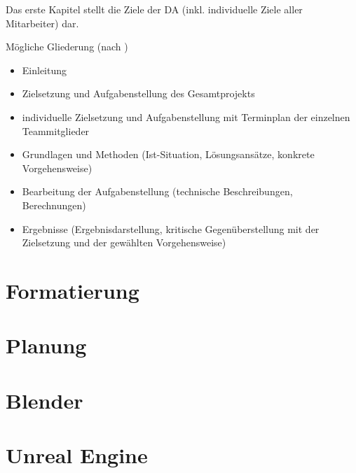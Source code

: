 \documentclass[
    headings=optiontotocandhead,%
    twoside,
    numbers=noenddot,%
    toc=flat, %
    12pt, %
    titlepage, %
    parskip=full, %
    listof=totoc, %
    listof=flat, %
    numbers=noenddot, %
    bibliography=totoc, %
    a4paper,DIV=14,
    BCOR=15mm,
]{scrbook}
\begin{document}
Das erste Kapitel stellt die Ziele der DA (inkl. individuelle Ziele
aller Mitarbeiter) dar.

Mögliche Gliederung (nach \cite{leitfaden})

\begin{itemize}
\item  Einleitung
\item   Zielsetzung und Aufgabenstellung des Gesamtprojekts
\item   individuelle Zielsetzung und Aufgabenstellung mit Terminplan der einzelnen Teammitglieder
\item   Grundlagen und Methoden (Ist-Situation, Lösungsansätze, konkrete Vorgehensweise)
\item   Bearbeitung der Aufgabenstellung (technische Beschreibungen, Berechnungen)
\item   Ergebnisse (Ergebnisdarstellung, kritische Gegenüberstellung mit der Zielsetzung
 und der gewählten Vorgehensweise)
\end{itemize}

\chapter{Formatierung}
\renewcommand{\kapitelautor}{Autor: Benjamin Lichtenstein}



\chapter{Planung}

\renewcommand{\kapitelautor}{}



\chapter{Blender}

\renewcommand{\kapitelautor}{}



\chapter{Unreal Engine}
\end{document}
